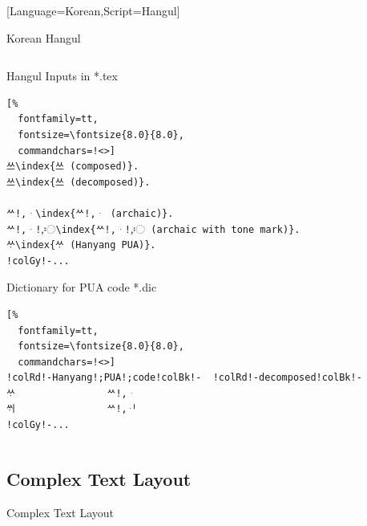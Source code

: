 \documentclass[aspectratio=169,10pt]{beamer}
\begin{document}
\setmonofont{Noto Sans Mono CJK KR}[Language=Korean,Script=Hangul]
\begin{frame}[fragile]{Korean Hangul}

\begin{columns}
\begin{column}{70mm}

\setmonofont{Noto Sans Mono CJK KR}
\begin{exampleblock}{Hangul Inputs in *.tex}
\begin{Verbatim}[%
  fontfamily=tt,
  fontsize=\fontsize{8.0}{8.0},
  commandchars=!<>]
쓰\index{쓰 (composed)}.
쓰\index{쓰 (decomposed)}.

ᄊ!,ᆞ\index{ᄊ!,ᆞ (archaic)}.
ᄊ!,ᆞ!,〯\index{ᄊ!,ᆞ!,〯 (archaic with tone mark)}.
ᄊᆞ\index{ᄊᆞ (Hanyang PUA)}.
!colGy!-...
\end{Verbatim}
\end{exampleblock}
\begin{exampleblock}{Dictionary for PUA code *.dic}
\begin{Verbatim}[%
  fontfamily=tt,
  fontsize=\fontsize{8.0}{8.0},
  commandchars=!<>]
!colRd!-Hanyang!;PUA!;code!colBk!-  !colRd!-decomposed!colBk!-
ᄊᆞ                ᄊ!,ᆞ
ᄊᆡ                ᄊ!,ᆡ
!colGy!-...
\end{Verbatim}
\end{exampleblock}
\end{column}

\begin{column}{60mm}
\begin{center}
%
\end{center}
\end{column}
\end{columns}

\end{frame}


\subsection{Complex Text Layout}
\begin{frame}{Complex Text Layout}
\begin{columns}
\end{columns}
\end{frame}
\end{document}

